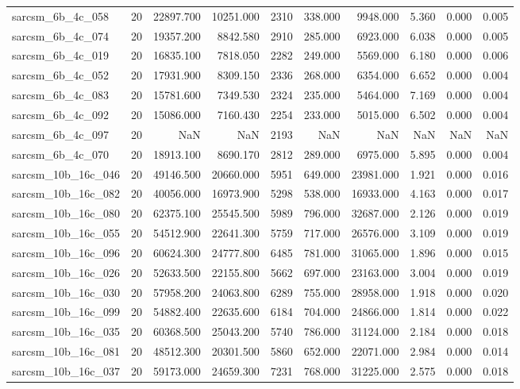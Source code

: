 \begin{tabular}{lrrrrrrrrr}
sarcsm\_6b\_4c\_058 & 20 & 22897.700 & 10251.000 & 2310 & 338.000 & 9948.000 & 5.360 & 0.000 & 0.005 \\
sarcsm\_6b\_4c\_074 & 20 & 19357.200 & 8842.580 & 2910 & 285.000 & 6923.000 & 6.038 & 0.000 & 0.005 \\
sarcsm\_6b\_4c\_019 & 20 & 16835.100 & 7818.050 & 2282 & 249.000 & 5569.000 & 6.180 & 0.000 & 0.006 \\
sarcsm\_6b\_4c\_052 & 20 & 17931.900 & 8309.150 & 2336 & 268.000 & 6354.000 & 6.652 & 0.000 & 0.004 \\
sarcsm\_6b\_4c\_083 & 20 & 15781.600 & 7349.530 & 2324 & 235.000 & 5464.000 & 7.169 & 0.000 & 0.004 \\
sarcsm\_6b\_4c\_092 & 20 & 15086.000 & 7160.430 & 2254 & 233.000 & 5015.000 & 6.502 & 0.000 & 0.004 \\
sarcsm\_6b\_4c\_097 & 20 & NaN & NaN & 2193 & NaN & NaN & NaN & NaN & NaN \\
sarcsm\_6b\_4c\_070 & 20 & 18913.100 & 8690.170 & 2812 & 289.000 & 6975.000 & 5.895 & 0.000 & 0.004 \\
sarcsm\_10b\_16c\_046 & 20 & 49146.500 & 20660.000 & 5951 & 649.000 & 23981.000 & 1.921 & 0.000 & 0.016 \\
sarcsm\_10b\_16c\_082 & 20 & 40056.000 & 16973.900 & 5298 & 538.000 & 16933.000 & 4.163 & 0.000 & 0.017 \\
sarcsm\_10b\_16c\_080 & 20 & 62375.100 & 25545.500 & 5989 & 796.000 & 32687.000 & 2.126 & 0.000 & 0.019 \\
sarcsm\_10b\_16c\_055 & 20 & 54512.900 & 22641.300 & 5759 & 717.000 & 26576.000 & 3.109 & 0.000 & 0.019 \\
sarcsm\_10b\_16c\_096 & 20 & 60624.300 & 24777.800 & 6485 & 781.000 & 31065.000 & 1.896 & 0.000 & 0.015 \\
sarcsm\_10b\_16c\_026 & 20 & 52633.500 & 22155.800 & 5662 & 697.000 & 23163.000 & 3.004 & 0.000 & 0.019 \\
sarcsm\_10b\_16c\_030 & 20 & 57958.200 & 24063.800 & 6289 & 755.000 & 28958.000 & 1.918 & 0.000 & 0.020 \\
sarcsm\_10b\_16c\_099 & 20 & 54882.400 & 22635.600 & 6184 & 704.000 & 24866.000 & 1.814 & 0.000 & 0.022 \\
sarcsm\_10b\_16c\_035 & 20 & 60368.500 & 25043.200 & 5740 & 786.000 & 31124.000 & 2.184 & 0.000 & 0.018 \\
sarcsm\_10b\_16c\_081 & 20 & 48512.300 & 20301.500 & 5860 & 652.000 & 22071.000 & 2.984 & 0.000 & 0.014 \\
sarcsm\_10b\_16c\_037 & 20 & 59173.000 & 24659.300 & 7231 & 768.000 & 31225.000 & 2.575 & 0.000 & 0.018 \\

\end{tabular}

